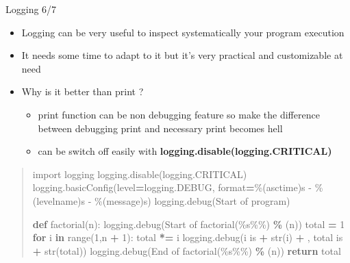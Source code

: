 \documentclass[
  8pt,
  ignorenonframetext,
]{beamer}
\newenvironment{Shaded}{\begin{snugshade}}{\end{snugshade}}
\newcommand{\BuiltInTok}[1]{#1}
\newcommand{\ControlFlowTok}[1]{\textcolor[rgb]{0.13,0.29,0.53}{\textbf{#1}}}
\newcommand{\DecValTok}[1]{\textcolor[rgb]{0.00,0.00,0.81}{#1}}
\newcommand{\ImportTok}[1]{#1}
\newcommand{\KeywordTok}[1]{\textcolor[rgb]{0.13,0.29,0.53}{\textbf{#1}}}
\newcommand{\NormalTok}[1]{#1}
\newcommand{\OperatorTok}[1]{\textcolor[rgb]{0.81,0.36,0.00}{\textbf{#1}}}
\newcommand{\SpecialCharTok}[1]{\textcolor[rgb]{0.00,0.00,0.00}{#1}}
\newcommand{\StringTok}[1]{\textcolor[rgb]{0.31,0.60,0.02}{#1}}
\providecommand{\tightlist}{%
  \setlength{\itemsep}{0pt}\setlength{\parskip}{0pt}}
\begin{document}
\begin{frame}[fragile]{Logging 6/7}
\protect\hypertarget{logging-67}{}
\begin{itemize}[<+->]
\tightlist
\item
  Logging can be very useful to inspect systematically your program
  execution
\end{itemize}

\begin{itemize}[<+->]
\tightlist
\item
  It needs some time to adapt to it but it's very practical and
  customizable at need
\end{itemize}

\begin{itemize}[<+->]
\tightlist
\item
  Why is it better than print ?

  \begin{itemize}[<+->]
  \tightlist
  \item
    print function can be non debugging feature so make the difference
    between debugging print and necessary print becomes hell
  \item
    can be switch off easily with
    \textbf{logging.disable(logging.CRITICAL)}
  \end{itemize}
\end{itemize}

\begin{quote}
\begin{Shaded}
\begin{Highlighting}[]
\ImportTok{import}\NormalTok{ logging}
\NormalTok{logging.disable(logging.CRITICAL)}
\NormalTok{logging.basicConfig(level}\OperatorTok{=}\NormalTok{logging.DEBUG, }\BuiltInTok{format}\OperatorTok{=}\StringTok{\textquotesingle{}}\SpecialCharTok{\%(asctime)s}\StringTok{ {-} }\SpecialCharTok{\%(levelname)s}\StringTok{ {-} }\SpecialCharTok{\%(message)s}\StringTok{\textquotesingle{}}\NormalTok{)}
\NormalTok{logging.debug(}\StringTok{\textquotesingle{}Start of program\textquotesingle{}}\NormalTok{)}

\KeywordTok{def}\NormalTok{ factorial(n):}
\NormalTok{    logging.debug(}\StringTok{\textquotesingle{}Start of factorial(}\SpecialCharTok{\%s\%\%}\StringTok{)\textquotesingle{}}  \OperatorTok{\%}\NormalTok{ (n))}
\NormalTok{    total }\OperatorTok{=} \DecValTok{1}
    \ControlFlowTok{for}\NormalTok{ i }\KeywordTok{in} \BuiltInTok{range}\NormalTok{(}\DecValTok{1}\NormalTok{,n }\OperatorTok{+} \DecValTok{1}\NormalTok{):}
\NormalTok{        total }\OperatorTok{*=}\NormalTok{ i}
\NormalTok{        logging.debug(}\StringTok{\textquotesingle{}i is \textquotesingle{}} \OperatorTok{+} \BuiltInTok{str}\NormalTok{(i) }\OperatorTok{+} \StringTok{\textquotesingle{}, total is \textquotesingle{}} \OperatorTok{+} \BuiltInTok{str}\NormalTok{(total))}
\NormalTok{    logging.debug(}\StringTok{\textquotesingle{}End of factorial(}\SpecialCharTok{\%s\%\%}\StringTok{)\textquotesingle{}}  \OperatorTok{\%}\NormalTok{ (n))}
    \ControlFlowTok{return}\NormalTok{ total}


\end{Highlighting}
\end{Shaded}
\end{quote}
\end{frame}
\end{document}
